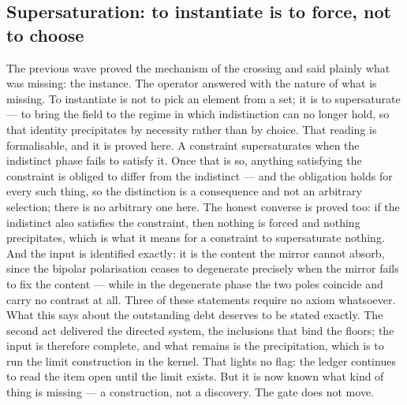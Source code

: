 \documentclass[11pt]{article}
\theoremstyle{definition}\newtheorem{deriv}{Derivation}
\begin{document}
\subsection*{Supersaturation: to instantiate is to force, not to choose}The previous wave proved the mechanism of the crossing and said plainly what was missing: the instance. The operator answered with the nature of what is missing. To instantiate is not to pick an element from a set; it is to supersaturate --- to bring the field to the regime in which indistinction can no longer hold, so that identity precipitates by necessity rather than by choice. That reading is formalisable, and it is proved here. A constraint supersaturates when the indistinct phase fails to satisfy it. Once that is so, anything satisfying the constraint is obliged to differ from the indistinct --- and the obligation holds for every such thing, so the distinction is a consequence and not an arbitrary selection; there is no arbitrary one here. The honest converse is proved too: if the indistinct also satisfies the constraint, then nothing is forced and nothing precipitates, which is what it means for a constraint to supersaturate nothing. And the input is identified exactly: it is the content the mirror cannot absorb, since the bipolar polarisation ceases to degenerate precisely when the mirror fails to fix the content --- while in the degenerate phase the two poles coincide and carry no contrast at all. Three of these statements require no axiom whatsoever. What this says about the outstanding debt deserves to be stated exactly. The second act delivered the directed system, the inclusions that bind the floors; the input is therefore complete, and what remains is the precipitation, which is to run the limit construction in the kernel. That lights no flag: the ledger continues to read the item open until the limit exists. But it is now known what kind of thing is missing --- a construction, not a discovery. The gate does not move.
\end{document}
